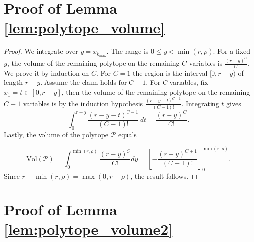 \documentclass[11pt]{article}
\theoremstyle{plain}
\theoremstyle{definition}
\begin{document}
\section{Proof of Lemma \ref{lem:polytope_volume}}
\label{proof-lemma-polytope-volume}
\begin{proof}
We integrate over $y = x_{k_{\max}}$. The range is $0 \le y < \min(r, \rho)$. For a fixed $y$, the volume of the remaining polytope on the remaining $C$ variables  is $\frac{(r-y)^C}{C!}$. We prove it by induction on $C$.  For $C=1$ the region is the interval $[0,r-y)$ of length $r-y$. Assume the claim holds for $C-1$. For $C$ variables, fix $x_1=t\in[0,r-y]$, then  the volume of the remaining polytope on the remaining $C-1$ variables is by the induction hypothesis $\frac{(r-y-t)^{C-1}}{(C-1)!}$. Integrating $t$ gives $$\int_{0}^{r-y}\frac{(r-y-t)^{C-1}}{(C-1)!}\,dt=\frac{(r-y)^C}{C!}.$$ Lastly, the volume of the polytope $\mathcal{P}$ equals 

$$ \text{Vol}(\mathcal{P}) = \int_0^{\min(r, \rho)} \frac{(r-y)^C}{C!} dy = \left[ -\frac{(r-y)^{C+1}}{(C+1)!} \right]_0^{\min(r, \rho)}. $$
Since $r-\min(r, \rho) = \max(0, r-\rho)$, the result follows.
\end{proof}


\section{Proof of Lemma \ref{lem:polytope_volume2}}
\label{proof-of-polytope-volume}
\end{document}

